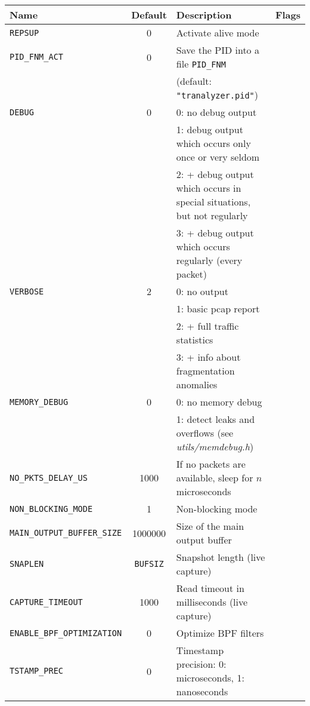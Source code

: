 \begin{center}
    \begin{tabularx}{\textwidth}{lcXl}
        \toprule
        {\bf Name} & {\bf Default} & {\bf Description} & {\bf Flags}\\
        \midrule
        {\tt REPSUP}            & 0   & Activate alive mode\\
        {\tt PID\_FNM\_ACT}     & 0   & Save the PID into a file {\tt PID\_FNM}\\
                                &     & (default: {\tt "tranalyzer.pid"})\\
        {\tt DEBUG}             & 0   & 0: no debug output\\
                                &     & 1: debug output which occurs only once or very seldom\\
                                &     & 2: + debug output which occurs in special situations, but not regularly\\
                                &     & 3: + debug output which occurs regularly (every packet)\\
        {\tt VERBOSE}           & 2   & 0: no output\\
                                &     & 1: basic pcap report\\
                                &     & 2: + full traffic statistics\\
                                &     & 3: + info about fragmentation anomalies\\
        {\tt MEMORY\_DEBUG}     & 0   & 0: no memory debug\\
                                &     & 1: detect leaks and overflows (see {\em utils/memdebug.h})\\
        {\tt NO\_PKTS\_DELAY\_US} & 1000 & If no packets are available, sleep for $n$ microseconds\\
        {\tt NON\_BLOCKING\_MODE} & 1 & Non-blocking mode\\
        {\tt MAIN\_OUTPUT\_BUFFER\_SIZE} & 1000000 & Size of the main output buffer\\
        {\tt SNAPLEN}           & {\small\tt BUFSIZ} & Snapshot length (live capture)\\
        {\tt CAPTURE\_TIMEOUT}  & 1000 & Read timeout in milliseconds (live capture)\\
        {\tt ENABLE\_BPF\_OPTIMIZATION} & 0   & Optimize BPF filters\\
        {\tt TSTAMP\_PREC}      & 0   & Timestamp precision: 0: microseconds, 1: nanoseconds\\

\end{tabularx}
\end{center}
